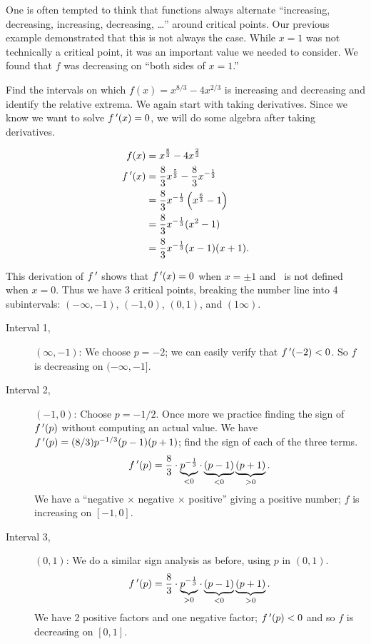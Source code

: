 One is often tempted to think that functions always alternate ``increasing, decreasing, increasing, decreasing, \dots'' around critical points. Our previous example demonstrated that this is not always the case. While $x=1$ was not technically a critical point, it was an important value we needed to consider. We found that $f$ was decreasing on ``both sides of $x=1$.''

\begin{example}\label{ex_incr3}%
Find the intervals on which $f(x) = x^{8/3}-4x^{2/3}$ is increasing and decreasing and identify the relative extrema.
\solution
We again start with taking derivatives. Since we know we want to solve $f\,'(x) = 0$, we will do some algebra after taking derivatives.

\begin{align*}
f(x) &= x^{\frac{8}{3}}-4x^{\frac{2}{3}} \\
f\,'(x) &= \frac83 x^{\frac53} - \frac83x^{-\frac13}\\
	&= \frac83x^{-\frac13}\left(x^{\frac63}-1\right)\\
	&=\frac83x^{-\frac13}(x^2-1)\\
	&=\frac83x^{-\frac13}(x-1)(x+1).
\end{align*}

This derivation of $f\,'$ shows that $f\,'(x) = 0$ when $x=\pm 1$ and \fp\ is not defined when $x=0$. Thus we have 3 critical points, breaking the number line into 4 subintervals: $(-\infty,-1)$, $(-1,0)$, $(0,1)$, and $(1\infty)$.

\begin{description}%
\item[Interval 1,] $(\infty,-1)$: We choose $p=-2$; we can easily verify that $f\,'(-2)<0$. So $f$ is decreasing on $(-\infty,-1]$.

\item[Interval 2,] $(-1,0)$: Choose $p=-1/2$. Once more we practice finding the sign of $f\,'(p)$ without computing an actual value. We have $f\,'(p) = (8/3)p^{-1/3}(p-1)(p+1)$; find the sign of each of the three terms. 
	\[f\,'(p) = \frac 83 \cdot \underbrace{p^{-\frac13}}_{<0}\cdot \underbrace{(p-1)}_{<0}\underbrace{(p+1)}_{>0}.\]
	We have a ``negative $\times$ negative $\times$ positive'' giving a positive number; $f$ is increasing on $[-1,0]$.

\item[Interval 3,] $(0,1)$: We do a similar sign analysis as before, using $p$ in $(0,1)$.
	\[f\,'(p) = \frac 83 \cdot \underbrace{p^{-\frac13}}_{>0}\cdot \underbrace{(p-1)}_{<0}\underbrace{(p+1)}_{>0}.\]
	We have 2 positive factors and one negative factor; $f\,'(p)<0$ and so $f$ is decreasing on $[0,1]$.


\end{description}
\end{example}
